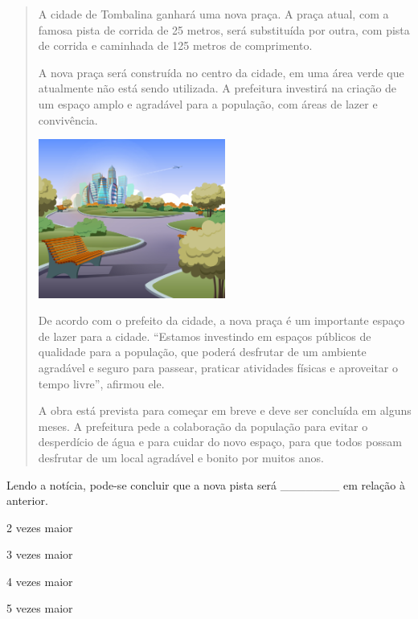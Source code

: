 \begin{quote}
A cidade de Tombalina ganhará uma nova praça. A praça atual, com a famosa pista de corrida de 25 metros, será substituída por outra, com pista de corrida e caminhada de 125 metros de comprimento.

A nova praça será construída no centro da cidade, em uma área verde que atualmente não está sendo utilizada. A prefeitura investirá na criação de um espaço amplo e agradável para a população, com áreas de lazer e convivência.

\vspace{1em}
\begin{center}
\includegraphics[width=0.5\textwidth]{./media/image62a.jpeg}
\end{center}
\vspace{1em}

De acordo com o prefeito da cidade, a nova praça é um importante espaço de lazer para a cidade. ``Estamos investindo em espaços públicos de qualidade para a população, que poderá desfrutar de um ambiente agradável e seguro para passear, praticar atividades físicas e aproveitar o tempo livre'', afirmou ele.

A obra está prevista para começar em breve e deve ser concluída em alguns meses. A prefeitura pede a colaboração da população para evitar o desperdício de água e para cuidar do novo espaço, para que todos possam desfrutar de um local agradável e bonito por muitos anos.

\end{quote}

Lendo a notícia, pode-se concluir que a nova pista será \_\_\_\_\_\_\_ em relação à anterior.

\begin{escolha}
\begin{multicols}{2}
\item
  2 vezes maior
\item
  3 vezes maior
\item
  4 vezes maior
\item
  5 vezes maior
  \end{multicols}
\end{escolha}

